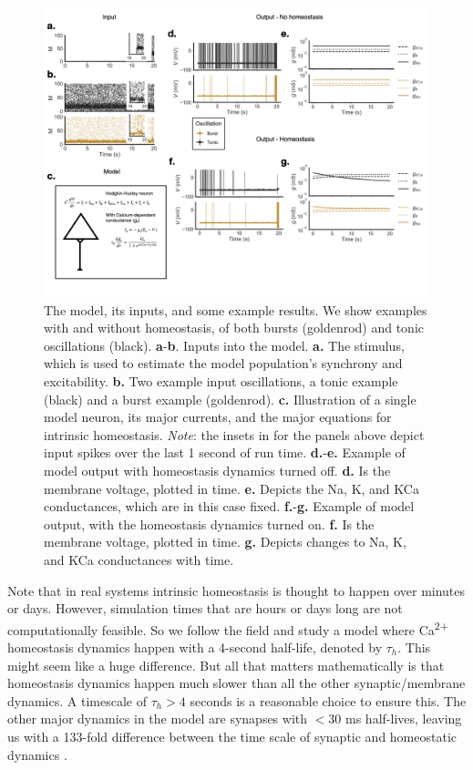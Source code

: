 \documentclass{article}
\begin{document}
\begin{figure}
\centering
\includegraphics[width=1\textwidth]{fig1.png}
\caption{\label{fig:f1}
    The model, its inputs, and some example results. We show examples with and without homeostasis, of both bursts (goldenrod) and tonic oscillations (black).
    \textbf{a}-\textbf{b}. Inputs into the model. \textbf{a.} The stimulus, which is used to estimate the model population's synchrony and excitability. \textbf{b.} Two example input oscillations, a tonic example (black) and a burst example (goldenrod).
    \textbf{c.} Illustration of a single model neuron, its major currents, and the major equations for intrinsic homeostasis. 
    \textit{Note}: the insets in for the panels above depict input spikes over the last 1 second of run time.
    \textbf{d.}-\textbf{e.} Example of model output with homeostasis dynamics turned off. \textbf{d.} Is the membrane voltage, plotted in time. \textbf{e.} Depicts the Na, K, and KCa conductances, which are in this case fixed.
    \textbf{f.}-\textbf{g.} Example of model output, with the homeostasis dynamics turned on. \textbf{f.} Is the membrane voltage, plotted in time. \textbf{g.} Depicts changes to Na, K, and KCa conductances with time. 
}
\end{figure}

Note that in real systems intrinsic homeostasis is thought to happen over minutes or days. However, simulation times that are hours or days long are not computationally feasible. So we follow the field and study a model where Ca\textsuperscript{2+} homeostasis dynamics happen with a 4-second half-life, denoted by $\tau_h$. This might seem like a huge difference. But all that matters mathematically is that homeostasis dynamics happen much slower than all the other synaptic/membrane dynamics. A timescale of $\tau_h > 4$ seconds is a reasonable choice to ensure this. The other major dynamics in the model are synapses with $< 30$ ms half-lives, leaving us with a 133-fold difference between the time scale of synaptic and homeostatic dynamics \cite{Golowasch1999,Marder2014,Marder2015,Gutierrez2013,Marder2014,OLeary2014,LeMasson1993,Abbott1993}.
\end{document}
